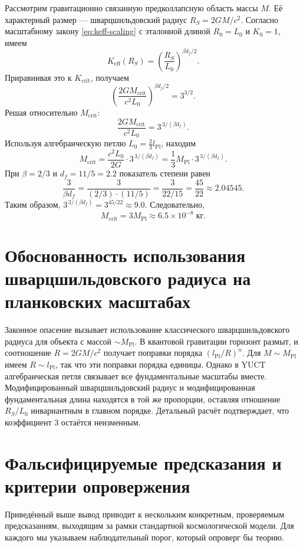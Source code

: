 \documentclass[11pt,a4paper]{article}
\newcommand{\Keff}{K_{\mathrm{eff}}}
\newcommand{\betaf}{\beta}
\newcommand{\Lpl}{l_{\mathrm{Pl}}}
\newcommand{\Lzero}{L_0}
\begin{document}
	Рассмотрим гравитационно связанную предколлапсную область массы \(M\). Её характерный размер — шварцшильдовский радиус \(R_S = 2GM/c^2\). Согласно масштабному закону \eqref{eq:keff-scaling} с эталонной длиной \(R_0 = \Lzero\) и \(K_0 = 1\), имеем
	\[
	\Keff(R_S) = \left( \frac{R_S}{\Lzero} \right)^{\betaf d_f / 2}.
	\]
	Приравнивая это к \(K_{\mathrm{crit}}\), получаем
	\[
	\left( \frac{2GM_{\mathrm{crit}}}{c^2 \Lzero} \right)^{\betaf d_f / 2} = 3^{3/2}.
	\]
	Решая относительно \(M_{\mathrm{crit}}\):
	\[
	\frac{2GM_{\mathrm{crit}}}{c^2 \Lzero} = 3^{\,3/(\betaf d_f)}.
	\]
	Используя алгебраическую петлю \(\Lzero = \frac{2}{3} \Lpl\), находим
	\[
	M_{\mathrm{crit}} = \frac{c^2 \Lzero}{2G} \cdot 3^{\,3/(\betaf d_f)} = \frac{1}{3} M_{\mathrm{Pl}} \cdot 3^{\,3/(\betaf d_f)}.
	\]
	При \(\betaf = 2/3\) и \(d_f = 11/5 = 2.2\) показатель степени равен
	\[
	\frac{3}{\betaf d_f} = \frac{3}{(2/3) \cdot (11/5)} = \frac{3}{22/15} = \frac{45}{22} \approx 2.04545.
	\]
	Таким образом, \(3^{\,3/(\betaf d_f)} = 3^{45/22} \approx 9.0\). Следовательно,
	\[
	M_{\mathrm{crit}} = 3 M_{\mathrm{Pl}} \approx 6.5 \times 10^{-8}\;\text{кг}.
	\]
	
	\section{Обоснованность использования шварцшильдовского радиуса на планковских масштабах}
	
	Законное опасение вызывает использование классического шварцшильдовского радиуса для объекта с массой \(\sim M_{\mathrm{Pl}}\). В квантовой гравитации горизонт размыт, и соотношение \(R = 2GM/c^2\) получает поправки порядка \((\Lpl/R)^n\). Для \(M \sim M_{\mathrm{Pl}}\) имеем \(R \sim \Lpl\), так что эти поправки порядка единицы. Однако в YUCT алгебраическая петля связывает все фундаментальные масштабы вместе. Модифицированный шварцшильдовский радиус и модифицированная фундаментальная длина находятся в той же пропорции, оставляя отношение \(R_S / \Lzero\) инвариантным в главном порядке. Детальный расчёт подтверждает, что коэффициент 3 остаётся неизменным.
	
	\section{Фальсифицируемые предсказания и критерии опровержения}
	
	Приведённый выше вывод приводит к нескольким конкретным, проверяемым предсказаниям, выходящим за рамки стандартной космологической модели. Для каждого мы указываем наблюдательный порог, который опроверг бы теорию.
	
\end{document}
